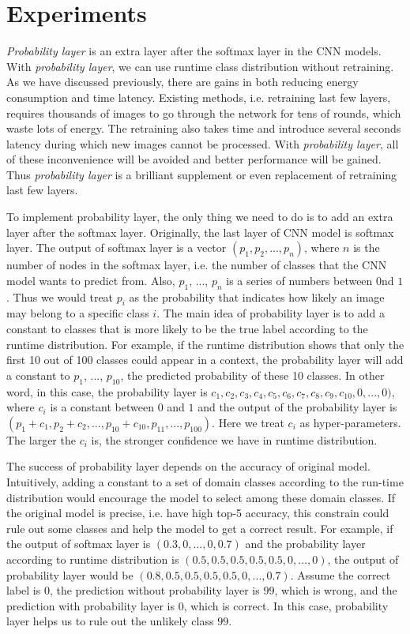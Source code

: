 \documentclass{article}
\begin{document}
\section{Experiments}
\textit{Probability layer} is an extra layer after the softmax layer in the CNN models. With \textit{probability layer}, we can use runtime class distribution without retraining. As we have discussed previously, there are gains in both reducing energy consumption and time latency. Existing methods, i.e. retraining last few layers, requires thousands of images to go through the network for tens of rounds, which waste lots of energy. The retraining also takes time and introduce several seconds latency during which new images cannot be processed. With \textit{probability layer}, all of these inconvenience will be avoided and better performance will be gained. Thus \textit{probability layer} is a brilliant supplement or even replacement of retraining last few layers.

To implement probability layer, the only thing we need to do is to add an extra layer after the softmax layer. Originally, the last layer of CNN model is softmax layer. The output of softmax layer is a vector $(p_1, p_2, ..., p_n)$, where $n$ is the number of nodes in the softmax layer, i.e. the number of classes that the CNN model wants to predict from. Also, $p_1$, ..., $p_n$ is a series of numbers between $0$nd $1$. Thus we would treat $p_i$ as the probability that indicates how likely an image may belong to a specific class $i$. The main idea of probability layer is to add a constant to classes that is more likely to be the true label according to the runtime distribution. For example, if the runtime distribution shows that only the first 10 out of 100 classes could appear in a context, the probability layer will add a constant to $p_1$, ..., $p_{10}$, the predicted probability of these 10 classes. In other word, in this case, the probability layer is $ c_1, c_2, c_3, c_4, c_5, c_6, c_7, c_8, c_9, c_{10}, 0, ...,0 )$, where $c_i$ is a constant between $0$ and $1$ and the output of the probability layer is $(p_1 + c_1, p_2 + c_2, ..., p_{10}+c_{10}, p_{11}, ..., p_{100})$. Here we treat $c_i$ as hyper-parameters. The larger the $c_i$ is, the stronger confidence we have in runtime distribution.

The success of probability layer depends on the accuracy of original model. Intuitively, adding a constant to a set of domain classes according to the run-time distribution would encourage the model to select among these domain classes. If the original model is precise, i.e. have high top-5 accuracy, this constrain could rule out some classes and help the model to get a correct result. For example, if the output of softmax layer is $(0.3, 0, ..., 0, 0.7)$ and the probability layer according to runtime distribution is $(0.5, 0.5, 0.5, 0.5, 0.5, 0, ..., 0)$, the output of probability layer would be $(0.8, 0.5, 0.5, 0.5, 0.5, 0, ..., 0.7)$. Assume the correct label is $0$,  the prediction without probability layer is $99$, which is wrong, and the prediction with probability layer is $0$, which is correct. In this case, probability layer helps us to rule out the unlikely class $99$.
\end{document}
